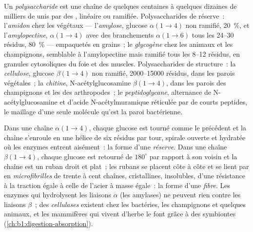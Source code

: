 \begin{definition}[Polysaccharide]\label{def:b1:carbohydrates:polysaccharide}
Un \emph{polysaccharide} est une chaîne de
quelques centaines à quelques dizaines de milliers de 
unis par des , linéaire ou ramifiée. Polysaccharides
de réserve~: l'\emph{amidon} chez les végétaux ---
l'\emph{amylose}, glucose $\alpha(1{\to}4)$ non ramifié, \qty{20}{\%},
et l'\emph{amylopectine}, $\alpha(1{\to}4)$ avec des branchements
$\alpha(1{\to}6)$ tous les \qtyrange{24}{30}{} résidus, \qty{80}{\%} ---
empaquetés en grains~; le \emph{glycogène} chez les
animaux et les champignons, semblable à l'amylopectine mais ramifié tous
les \qtyrange{8}{12}{} résidus, en granules cytosoliques du foie et des
muscles. Polysaccharides de structure~: la
\emph{cellulose}, glucose $\beta(1{\to}4)$ non ramifié,
\qtyrange{2000}{15000}{} résidus, dans les parois végétales~; la
\emph{chitine}, N-acétylglucosamine $\beta(1{\to}4)$,
dans les parois des champignons et les  des arthropodes~; le
\emph{peptidoglycane}, alternance de
N-acétylglucosamine et d'acide N-acétylmuramique réticulée par de courts
peptides, le maillage d'une seule molécule qu'est la paroi bactérienne.
\end{definition}

\begin{proposition}\label{prop:b1:carbohydrates:alphabeta}
Dans une chaîne $\alpha(1{\to}4)$, chaque glucose est tourné comme le
précédent et la chaîne s'enroule en une hélice de six résidus par tour,
spirale ouverte et hydratée où les enzymes entrent aisément~: la forme
d'une \emph{réserve}. Dans une chaîne $\beta(1{\to}4)$, chaque glucose
est retourné de $180^\circ$ par rapport à son voisin et la chaîne est un
ruban droit et plat~; les rubans se placent côte à côte et se lient par
 en \emph{microfibrilles} de trente à cent chaînes,
cristallines, insolubles, d'une résistance à la traction égale à celle
de l'acier à masse égale~: la forme d'une \emph{fibre}. Les enzymes qui
hydrolysent les liaisons $\alpha$ (les amylases) ne peuvent rien contre
les liaisons $\beta$~; des \emph{cellulases} existent chez les
bactéries, les champignons et quelques animaux, et les mammifères qui
vivent d'herbe le font grâce à des symbiontes
(\cref{ch:b1:digestion-absorption}).
\end{proposition}

